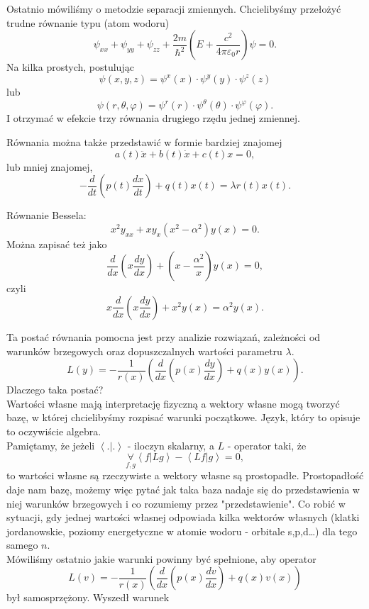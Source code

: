 \documentclass[../main.tex]{subfiles}
\begin{document}
		Ostatnio mówiliśmy o metodzie separacji zmiennych. Chcielibyśmy przełożyć trudne równanie typu (atom wodoru)
		\[
				\psi_{x x} + \psi_{y y} + \psi_{z z} + \frac{2m}{\hbar ^2}\left( E+\frac{c^2}{4\pi \varepsilon_0 r} \right) \psi = 0
		.\]
		Na kilka prostych, postulując
		\[
				\psi(x,y,z) = \psi^x(x) \cdot \psi^y(y) \cdot \psi^z(z)
				\]
				lub
				\[
				\psi(r,\theta,\varphi) = \psi^r(r) \cdot \psi^\theta(\theta) \cdot \psi^\varphi(\varphi)
				.\]
				I otrzymać w efekcie trzy równania drugiego rzędu jednej zmiennej.

				Równania można także przedstawić w formie bardziej znajomej
				\[
						a(t) \ddot{x} + b(t)\dot{x} + c(t)x = 0
				,\]
				lub mniej znajomej,
				\[
						- \frac{d}{dt}\left( p(t)\frac{dx}{dt} \right) + q(t)x(t) = \lambda r(t) x(t)
				.\]
		\begin{przyklad}
				Równanie Bessela:
				\[
						x^2 y_{x x} + x y_x (x^2 - \alpha^2)y(x) = 0
				.\]
				Można zapisać też jako
\[
		\frac{d}{dx}\left( x \frac{dy}{dx} \right) + \left( x - \frac{\alpha^2}{x} \right) y(x) = 0
,\]
czyli
\[
		x \frac{d}{dx}\left( x \frac{dy}{dx} \right) + x^2 y(x) = \alpha^2y(x)
.\]
		\end{przyklad}
Ta postać równania pomocna jest przy analizie rozwiązań, zależności od warunków brzegowych oraz dopuszczalnych wartości parametru $\lambda$.
\[
		L(y) = -\frac{1}{r(x)}\left( \frac{d}{dx}\left( p(x) \frac{dy}{dx} \right) + q(x) y(x) \right)
.\]
		Dlaczego taka postać?\\
		Wartości własne mają interpretację fizyczną a wektory własne mogą tworzyć bazę, w której chcielibyśmy rozpisać warunki początkowe. Język, który to opisuje to oczywiście algebra.\\
		Pamiętamy, że jeżeli $\left<.|. \right>$ - iloczyn skalarny, a $L$ - operator taki, że
		\[
		\underset{f,g}{\forall} \left<f|Lg \right> - \left<Lf|g \right> = 0
		,\]
		to wartości własne są rzeczywiste a wektory własne są prostopadłe. Prostopadłość daje nam bazę, możemy więc pytać jak taka baza nadaje się do przedstawienia w niej warunków brzegowych i co rozumiemy przez "przedstawienie". Co robić w sytuacji, gdy jednej wartości własnej odpowiada kilka wektorów własnych (klatki jordanowskie, poziomy energetyczne w atomie wodoru - orbitale s,p,d\ldots) dla tego samego $n$.\\
		Mówiliśmy ostatnio jakie warunki powinny być spełnione, aby operator
		\[
				L(v) = -\frac{1}{r(x)}\left( \frac{d}{dx}\left( p(x) \frac{dv}{dx} \right) + q(x) v(x) \right)
		\]
		był samosprzężony. Wyszedł warunek
\end{document}
